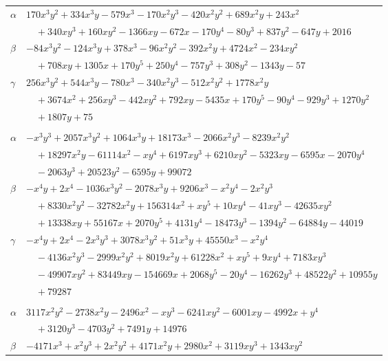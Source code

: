 \documentclass[11pt]{article}
\begin{document}
\begin{longtable}{@{}ll@{}}
$\alpha$ & $170x^{3}y^{2}+334x^{3}y-579x^{3}-170x^{2}y^{3}-420x^{2}y^{2}+689x^{2}y+243x^{2}$\\
 & $\quad +340xy^{3}+160xy^{2}-1366xy-672x-170y^{4}-80y^{3}+837y^{2}-647y+2016$\\
$\beta$ & $-84x^{3}y^{2}-124x^{3}y+378x^{3}-96x^{2}y^{2}-392x^{2}y+4724x^{2}-234xy^{2}$\\
 & $\quad +708xy+1305x+170y^{5}+250y^{4}-757y^{3}+308y^{2}-1343y-57$\\
$\gamma$ & $256x^{3}y^{2}+544x^{3}y-780x^{3}-340x^{2}y^{3}-512x^{2}y^{2}+1778x^{2}y$\\
 & $\quad +3674x^{2}+256xy^{3}-442xy^{2}+792xy-5435x+170y^{5}-90y^{4}-929y^{3}+1270y^{2}$\\
 & $\quad +1807y+75$\\
\addlinespace[3pt]
\multicolumn{2}{@{}l}{$\{i,j\}=\{123,173\}$, $k_{ij}=2^{8}\cdot 3^{3}\cdot 43$}\\
$\alpha$ & $-x^{3}y^{3}+2057x^{3}y^{2}+1064x^{3}y+18173x^{3}-2066x^{2}y^{3}-8239x^{2}y^{2}$\\
 & $\quad +18297x^{2}y-61114x^{2}-xy^{4}+6197xy^{3}+6210xy^{2}-5323xy-6595x-2070y^{4}$\\
 & $\quad -2063y^{3}+20523y^{2}-6595y+99072$\\
$\beta$ & $-x^{4}y+2x^{4}-1036x^{3}y^{2}-2078x^{3}y+9206x^{3}-x^{2}y^{4}-2x^{2}y^{3}$\\
 & $\quad +8330x^{2}y^{2}-32782x^{2}y+156314x^{2}+xy^{5}+10xy^{4}-41xy^{3}-42635xy^{2}$\\
 & $\quad +13338xy+55167x+2070y^{5}+4131y^{4}-18473y^{3}-1394y^{2}-64884y-44019$\\
$\gamma$ & $-x^{4}y+2x^{4}-2x^{3}y^{3}+3078x^{3}y^{2}+51x^{3}y+45550x^{3}-x^{2}y^{4}$\\
 & $\quad -4136x^{2}y^{3}-2999x^{2}y^{2}+8019x^{2}y+61228x^{2}+xy^{5}+9xy^{4}+7183xy^{3}$\\
 & $\quad -49907xy^{2}+83449xy-154669x+2068y^{5}-20y^{4}-16262y^{3}+48522y^{2}+10955y$\\
 & $\quad +79287$\\
\addlinespace[3pt]
\multicolumn{2}{@{}l}{$\{i,j\}=\{123,181\}$, $k_{ij}=2^{7}\cdot 3^{3}\cdot 13$}\\
$\alpha$ & $3117x^{2}y^{2}-2738x^{2}y-2496x^{2}-xy^{3}-6241xy^{2}-6001xy-4992x+y^{4}$\\
 & $\quad +3120y^{3}-4703y^{2}+7491y+14976$\\
$\beta$ & $-4171x^{3}+x^{2}y^{3}+2x^{2}y^{2}+4171x^{2}y+2980x^{2}+3119xy^{3}+1343xy^{2}$\\

\end{longtable}
\end{document}
